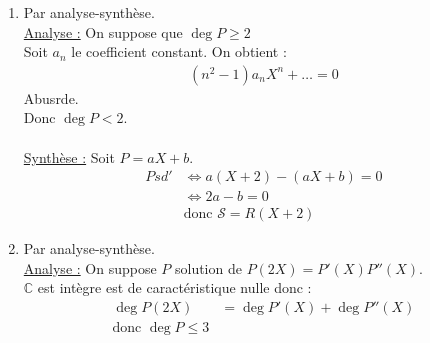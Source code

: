\documentclass[titlepage, twoside]{report}
\begin{document}
\begin{enumerate}
    \item Par analyse-synthèse. \\
    \underline{Analyse :}
    On suppose que $\deg P \geq 2$ \\
    Soit $a_n$ le coefficient constant. On obtient : 
    \begin{align*}
        (n^2 - 1) a_n X^n + \ldots = 0
    \end{align*}
    Abusrde. \\
    Donc $\deg P < 2$. \\ \\

    \noindent \underline{Synthèse :}
    Soit $P = aX + b$. 
    \begin{align*}
        Psd' &\Leftrightarrow a(X+2) - (aX + b) = 0 \\
        &\Leftrightarrow 2a - b = 0 \\
        &\text{donc } \mathcal{S} = R(X+2)
    \end{align*}

    \item Par analyse-synthèse. \\
    \underline{Analyse :}
    On suppose $P$ solution de $P(2X) = P'(X)P''(X)$. \\
    $\mathbb{C}$ est intègre est de caractéristique nulle donc : 
    \begin{align*}
        \deg P(2X) &= \deg P'(X) + \deg P''(X) \\
        \text{donc } \deg P \leq 3
    \end{align*} \\


\end{enumerate}
\end{document}
